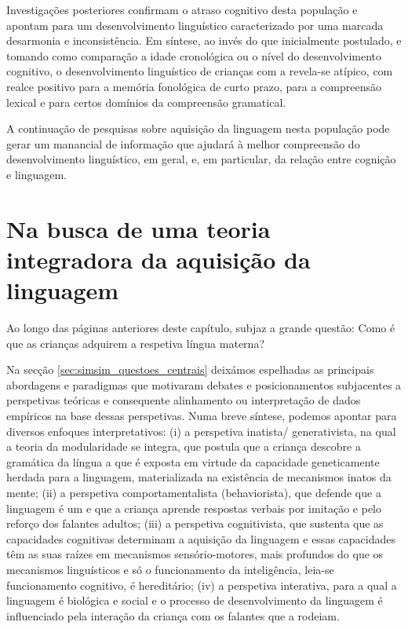 \documentclass[output=paper]{LSP/langsci}
\begin{document}
Investigações posteriores confirmam o atraso cognitivo desta população e apontam para um desenvolvimento linguístico caracterizado por uma marcada desarmonia e inconsistência. Em síntese, ao invés do que inicialmente postulado, e tomando como comparação a idade cronológica ou o nível do desenvolvimento cognitivo, o desenvolvimento linguístico de crianças com a  revela-se atípico, com realce positivo para a memória fonológica de curto prazo, para a compreensão lexical e para certos domínios da compreensão gramatical.

A continuação de pesquisas sobre aquisição da linguagem nesta população pode gerar um manancial de informação que ajudará à melhor compreensão do desenvolvimento linguístico, em geral, e, em particular, da relação entre cognição e linguagem. 

\section{Na busca de uma teoria integradora da aquisição da linguagem}
\label{sec:simsim_busca}

Ao longo das páginas anteriores deste capítulo, subjaz a grande questão: Como é que as crianças adquirem a respetiva língua materna?

Na secção \ref{sec:simsim_questoes_centrais} deixámos espelhadas as principais abordagens e paradigmas que motivaram debates e posicionamentos subjacentes a perspetivas teóricas e consequente alinhamento ou interpretação de dados empíricos na base dessas perspetivas. Numa breve síntese, podemos apontar para diversos enfoques interpretativos: (i) a perspetiva inatista/ generativista, na qual a teoria da modularidade se integra, que postula que a criança descobre a gramática da língua a que é exposta em virtude da capacidade geneticamente herdada para a linguagem, materializada na existência de mecanismos inatos da mente; (ii) a perspetiva comportamentalista (behaviorista), que defende que a linguagem é um  e que a criança aprende respostas verbais por imitação e pelo reforço dos falantes adultos; (iii) a perspetiva cognitivista, que sustenta que as capacidades cognitivas determinam a aquisição da linguagem e essas capacidades têm as suas raízes em mecanismos sensório-motores, mais profundos do que os mecanismos linguísticos e só o funcionamento da inteligência, leia-se funcionamento cognitivo, é hereditário; (iv) a perspetiva interativa, para a qual a linguagem é biológica e social e o processo de desenvolvimento da linguagem é influenciado pela interação da criança com os falantes que a rodeiam.
\end{document}
